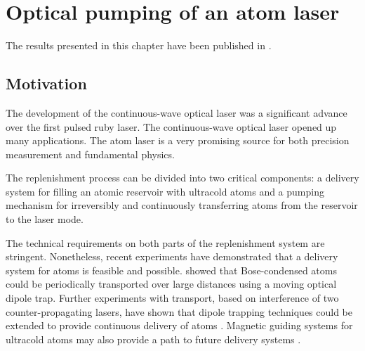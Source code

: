 \chapter{Optical pumping of an atom laser}
\label{OpticalPumping}
\graphicspath{{Figures/OpticalPumping/}{Figures/Common/}}

The results presented in this chapter have been published in \citet{Robins:2008,Doring:2009}.

\section{Motivation}

The development of the continuous-wave optical laser was a significant advance over the first pulsed ruby laser. The continuous-wave optical laser opened up many applications. The atom laser is a very promising source for both precision measurement and fundamental physics.

The replenishment process can be divided into two critical components: a delivery system for filling an atomic reservoir with ultracold atoms and a pumping mechanism for irreversibly and continuously transferring atoms from the reservoir to the laser mode.

The technical requirements on both parts of the replenishment system are stringent. Nonetheless, recent experiments have demonstrated that a delivery system for atoms is feasible and possible. \citet{Chikkatur:2002qa} showed that Bose-condensed atoms could be periodically transported over large distances using a moving optical dipole trap. Further experiments with transport, based on interference of two counter-propagating lasers, have shown that dipole trapping techniques could be extended to provide continuous delivery of atoms \citep{Schmid:2006}. Magnetic guiding systems for ultracold atoms may also provide a path to future delivery systems \citep{Lahaye:2004,Greiner:2001,Greiner:2007}.

